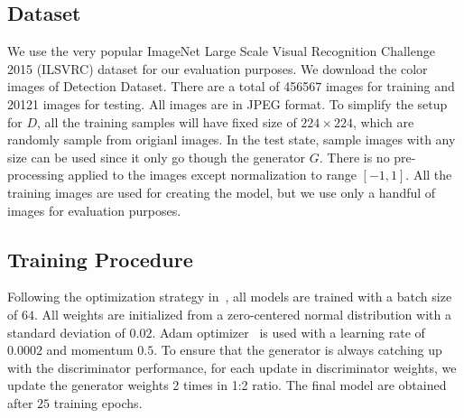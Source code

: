 \documentclass[10pt,twocolumn,letterpaper]{article}
\begin{document}
\subsection{Dataset}
We use the very popular ImageNet Large Scale Visual Recognition Challenge 2015 (ILSVRC) dataset for our evaluation purposes. We download the color images of Detection Dataset. There are a total of 456567 images for training and 20121 images for testing. All images are in JPEG format. To simplify the setup for $D$, all the training samples will have fixed size of $224\times 224$, which are randomly sample from origianl images. In the test state, sample images with any size can be used since it only go though the generator $G$. There is no pre-processing applied to the images except normalization to range $[-1,1]$. All the training images are used for creating the model, but we use only a handful of images for evaluation purposes.
\subsection{Training Procedure}
Following the optimization strategy in~\cite{radford2015unsupervised}, all models are trained with a batch size of $64$. 
All weights are initialized from a zero-centered normal distribution with a standard deviation of $0.02$. 
Adam optimizer~\cite{kingma2014adam} is used with a learning rate of $0.0002$ and momentum $0.5$. To ensure that the generator is always catching up with the discriminator performance, for each update in discriminator weights, we update the generator weights 2 times in 1:2 ratio. The final model are obtained after $25$ training epochs.
\end{document}
